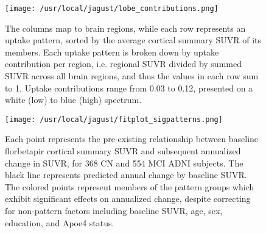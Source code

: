 \documentclass{article}
\begin{document}
\begin{figure}
\texttt{[image: /usr/local/jagust/lobe\_contributions.png]}
\caption{The columns map to brain regions, while each row represents an uptake pattern, sorted by the average cortical summary SUVR of its members. Each uptake pattern is broken down by uptake contribution per region, i.e. regional SUVR divided by summed SUVR across all brain regions, and thus the values in each row sum to 1. Uptake contributions range from 0.03 to 0.12, presented on a white (low) to blue (high) spectrum.}
\end{figure}

\begin{figure}
\texttt{[image: /usr/local/jagust/fitplot\_sigpatterns.png]}
\caption{Each point represents the pre-existing relationship between baseline florbetapir cortical summary SUVR and subsequent annualized change in SUVR, for 368 CN and 554 MCI ADNI subjects. The black line represents predicted annual change by baseline SUVR. The colored points represent members of the pattern groups which exhibit significant effects on annualized change, despite correcting for non-pattern factors including baseline SUVR, age, sex, education, and Apoe4 status.}
\end{figure}
\end{document}
